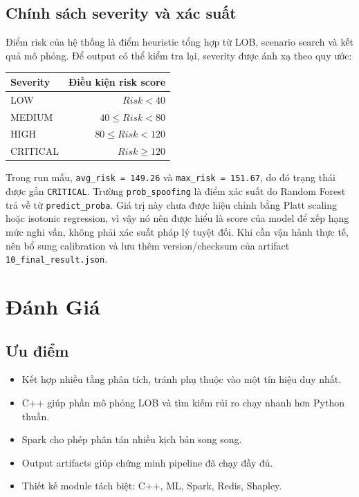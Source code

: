 \documentclass[12pt,a4paper]{report}
\begin{document}
\section{Chính sách severity và xác suất}

Điểm risk của hệ thống là điểm heuristic tổng hợp từ LOB, scenario search và kết quả mô phỏng. Để output có thể kiểm tra lại, severity được ánh xạ theo quy ước:

\begin{longtable}{lr}
\toprule
\textbf{Severity} & \textbf{Điều kiện risk score} \\
\midrule
LOW & \(Risk < 40\) \\
MEDIUM & \(40 \leq Risk < 80\) \\
HIGH & \(80 \leq Risk < 120\) \\
CRITICAL & \(Risk \geq 120\) \\
\bottomrule
\end{longtable}

Trong run mẫu, \texttt{avg\_risk = 149.26} và \texttt{max\_risk = 151.67}, do đó trạng thái được gắn \texttt{CRITICAL}. Trường \texttt{prob\_spoofing} là điểm xác suất do Random Forest trả về từ \texttt{predict\_proba}. Giá trị này chưa được hiệu chỉnh bằng Platt scaling hoặc isotonic regression, vì vậy nó nên được hiểu là score của model để xếp hạng mức nghi vấn, không phải xác suất pháp lý tuyệt đối. Khi cần vận hành thực tế, nên bổ sung calibration và lưu thêm version/checksum của artifact \texttt{10\_final\_result.json}.

\chapter{Đánh Giá}

\section{Ưu điểm}

\begin{itemize}
    \item Kết hợp nhiều tầng phân tích, tránh phụ thuộc vào một tín hiệu duy nhất.
    \item C++ giúp phần mô phỏng LOB và tìm kiếm rủi ro chạy nhanh hơn Python thuần.
    \item Spark cho phép phân tán nhiều kịch bản song song.
    \item Output artifacts giúp chứng minh pipeline đã chạy đầy đủ.
    \item Thiết kế module tách biệt: C++, ML, Spark, Redis, Shapley.
\end{itemize}
\end{document}
